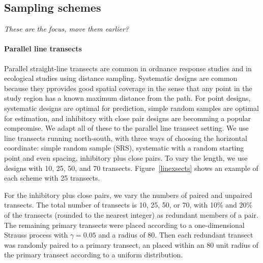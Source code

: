 \documentclass[review]{elsarticle}
\begin{document}



\subsection{Sampling schemes}

{\it These are the focus, move them earlier?}

\paragraph{Parallel line transects} Parallel straight-line transects are common
in ordnance response studies and in ecological studies using distance sampling.
Systematic designs are common because they pprovides good spatial coverage in
the sense that any point in the study region has a known maximum distance from
the path. For point designs, systematic designs are optimal for prediction,
simple random samples are optimal for estimation, and inhibitory with close
pair designs are becomming a popular compromise. We adapt all of these to the
parallel line transect setting. We use line transects running north-south, with
three ways of choosing the horizontal coordinate: simple random sample (SRS),
systematic with a random starting point and even spacing, inhibitory plus close
pairs. To vary the length, we use designs with 10, 25, 50, and 70 transects.
Figure~\ref{linexsects} shows an example of each scheme with 25 transects.

For the inhibitory plus close pairs, we vary the numbers of paired and unpaired
transects. The total number of transects is 10, 25, 50, or 70, with 10\% and
20\% of the transects (rounded to the nearest integer) as redundant members of
a pair. The remaining primary transects were placed according to a
one-dimensional Strauss process with \(\gamma = 0.05\) and a radius of 80. Then
each redundant transect was randomly paired to a primary transect, an placed
within an 80 unit radius of the primary transect according to a uniform
distribution.
\end{document}
